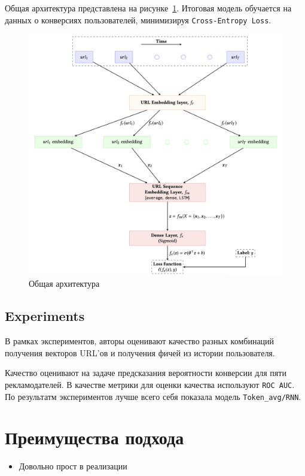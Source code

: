 Общая архитектура представлена на рисунке~\ref{fig:predicting_conversion}. Итоговая модель обучается на данных о конверсиях пользователей, минимизируя \texttt{Cross-Entropy Loss}.

\begin{figure}[ht]
    \centering
    \includegraphics[width=0.8\linewidth]{images/predicting_conversions.png}
    \caption{Общая архитектура}
    \label{fig:predicting_conversion}
\end{figure}

\subsection{Experiments}

В рамках экспериментов, авторы оценивают качество разных комбинаций получения векторов URL'ов и получения фичей из истории пользователя.

Качество оценивают на задаче предсказания вероятности конверсии для пяти рекламодателей. В качестве метрики для оценки качества используют \texttt{ROC AUC}. \\

По результатм экспериментов лучше всего себя показала модель \texttt{Token\_avg/RNN}.

\section{Преимущества подхода}

\begin{itemize}
    \item Довольно прост в реализации
\end{itemize}

